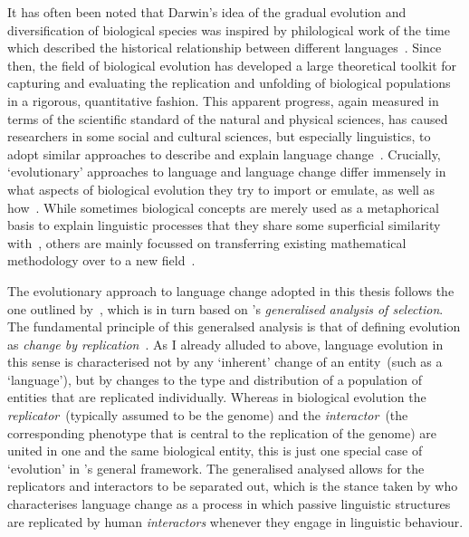 It has often been noted that Darwin's idea of the gradual evolution and diversification of biological species was inspired by philological work of the time which described the historical relationship between different languages~\citep{Darwin1871}. Since then, the field of biological evolution has developed a large theoretical toolkit for capturing and evaluating the replication and unfolding of biological populations in a rigorous, quantitative fashion. This apparent progress, again measured in terms of the scientific standard of the natural and physical sciences, has caused researchers in some social and cultural sciences, but especially linguistics, to adopt similar approaches to describe and explain language change~\citep[to list just a few monographs]{Croft2000,Blevins2004,McMahon2005,Ritt2009}.
Crucially, `evolutionary' approaches to language and language change differ immensely in what aspects of biological evolution they try to import or emulate, as well as how~\citep{Croft2000}. While sometimes biological concepts are merely used as a metaphorical basis to explain linguistic processes that they share some superficial similarity with~\citep[e.g.][]{Lass1990}, others are mainly focussed on transferring existing mathematical methodology over to a new field~\citep{BorgerhoffMulder2001,Atkinson2005a,Jager2008}.

The evolutionary approach to language change adopted in this thesis follows the one outlined by~\citet{Croft2000}, which is in turn based on \citeauthor{Hull1988}'s \emph{generalised analysis of selection}. The fundamental principle of this generalsed analysis is that of defining evolution as \emph{change by replication}~\citep[p.410]{Hull1988}. As I already alluded to above, language evolution in this sense is characterised not by any `inherent' change of an entity~(such as a `language'), but by changes to the type and distribution of a population of entities that are replicated individually.%
Whereas in biological evolution the \emph{replicator}~(typically assumed to be the genome) and the \emph{interactor}~(the corresponding phenotype that is central to the replication of the genome) are united in one and the same biological entity, this is just one special case of `evolution' in \citeauthor{Hull1988}'s general framework. The generalised analysed allows for the replicators and interactors to be separated out, which is the stance taken by \citet{Croft2000} who characterises language change as a process in which passive linguistic structures are replicated by human \emph{interactors} whenever they engage in linguistic behaviour.

